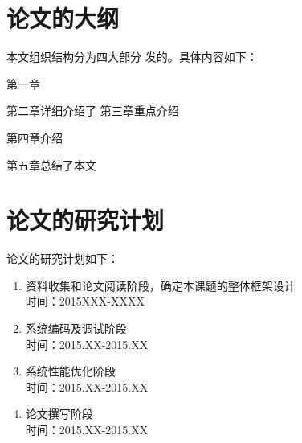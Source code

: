 \chapter{论文的大纲}
本文组织结构分为四大部分 发的。具体内容如下：

第一章 

第二章详细介绍了 
第三章重点介绍 

第四章介绍 

第五章总结了本文 

\chapter{论文的研究计划}
论文的研究计划如下：
\begin{enumerate}
	\item
	资料收集和论文阅读阶段，确定本课题的整体框架设计\\
	时间：2015XXX-XXXX
	
	\item
	系统编码及调试阶段\\
	时间：2015.XX-2015.XX
	
	\item
	系统性能优化阶段\\
	时间：2015.XX-2015.XX
	
	\item
	论文撰写阶段\\
	时间：2015.XX-2015.XX
\end{enumerate}




